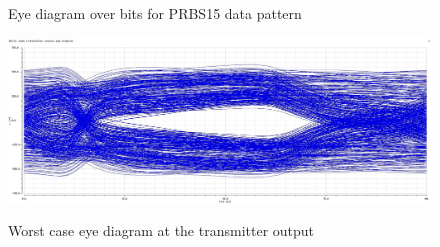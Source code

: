 \begin{figure}[H]
  \centering
  \caption{Eye diagram over \unit[5000]{bits} for PRBS15 data pattern}
  \label{fig:eye_prbs15}
\end{figure}

\begin{figure}[H]
  \centering
  {\includegraphics[scale=0.35]{img/wc_eye_tx.jpg}}
  \caption{Worst case eye diagram at the transmitter output}
  \label{fig:wc_eye}
\end{figure}